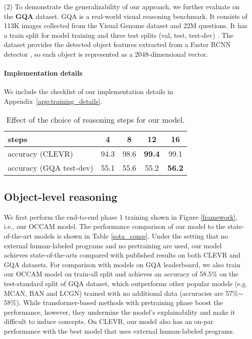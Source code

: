 \documentclass[10pt,twocolumn,letterpaper]{article}
\begin{document}
(2) To demonstrate the generalizability of our approach, we further evaluate on the \textbf{GQA} dataset.
GQA is a real-world visual reasoning benchmark. It consists of 113K images collected from the Visual Genome dataset \cite{krishna2017visual} and 22M questions. It has a train split for model training and three test splits (val, test, test-dev) \cite{hudson2019gqa}. The dataset provides the detected object features extracted from a Faster RCNN detector \cite{ren2015faster}, so each object is represented as a 2048-dimensional vector.


\vspace{-4mm}
\paragraph{Implementation details} We include the checklist of our implementation details in Appendix~\ref{app:training_details}.

\begin{table}[t!]
\small
    \centering
    \caption{\small{Effect of the choice of reasoning steps for our model.}}
    \begin{tabular}{l|cccc}
        \toprule
         steps & 4 & 8 & 12 & 16  \\
         \midrule
         accuracy (CLEVR) & 94.3 & 98.6 & \textbf{99.4} & 99.1 \\
         accuracy (GQA test-dev) & 55.1 & 55.6 & 55.2 & \textbf{56.2} \\
         \bottomrule
    \end{tabular}
    \label{ablation}
    \vspace{-3mm}
\end{table} \subsection{Object-level reasoning}
We first perform the end-to-end phase 1 training shown in Figure \ref{framework}, i.e., our OCCAM model. The performance comparison of our model to the state-of-the-art models is shown in Table \ref{sota_comp}. Under the setting that no external human-labeled programs and no pretraining are used, our model achieves state-of-the-arts compared with published results on both CLEVR and GQA datasets. For comparison with models on GQA leaderboard, we also train our OCCAM model on train-all split and achieves an accuracy of 58.5\% on the test-standard split of GQA dataset, which outperforms other popular models (e.g. MCAN, BAN and LCGN) trained with no additional data (accuracies are 57\%$\sim$58\%). While transformer-based methods with pretraining phase boost the performance, however, they undermine the model’s explainability and make it difficult to induce concepts. On CLEVR, our model also has an on-par performance with the best model \cite{yi2018neural} that uses external human-labeled programs.
\end{document}
